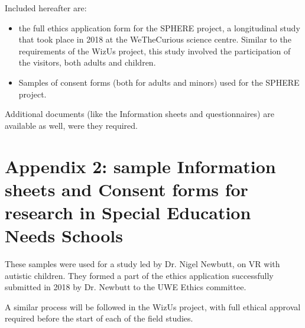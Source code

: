 \documentclass[11pt,a4paper]{report}
\newcommand{\project}{WizUs\xspace}
\begin{document}
Included hereafter are:

\begin{itemize}
    \item the full ethics application form for the SPHERE project, a
        longitudinal study that took place in 2018 at the WeTheCurious science
        centre. Similar to the requirements of the \project project, this study
        involved the participation of the visitors, both adults and children.
    \item Samples of consent forms (both for adults and minors) used for the
        SPHERE project.
\end{itemize}

Additional documents (like the Information sheets and questionnaires) are
available as well, were they required.




\newpage

\section{Appendix 2: sample Information sheets and Consent forms for research in
Special Education Needs Schools}

These samples were used for a study led by Dr. Nigel Newbutt, on VR with
autistic children. They formed a part of the ethics application successfully
submitted in 2018 by Dr. Newbutt to the UWE Ethics committee.

A similar process will be followed in the \project project, with full ethical
approval required before the start of each of the field studies.


\end{document}
